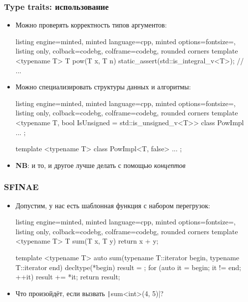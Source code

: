 \documentclass[10pt]{beamer}
\begin{document}
\begin{frame}[fragile]
\frametitle{Type traits: использование}
\begin{itemize}
\item Можно проверять корректность типов аргументов:
\begin{tcblisting}{listing engine=minted, minted language=cpp, minted options={fontsize=\scriptsize}, listing only, colback=codebg, colframe=codebg, rounded corners}
template <typename T>
T pow(T x, T n) {
  static_assert(std::is_integral_v<T>);
  // ...
}
\end{tcblisting}
\pause
\item Можно специализировать структуры данных и алгоритмы:
\begin{tcblisting}{listing engine=minted, minted language=cpp, minted options={fontsize=\scriptsize}, listing only, colback=codebg, colframe=codebg, rounded corners}
template <typename T, bool IsUnsigned = std::is_unsigned_v<T>>
class PowImpl { ... };

template <typename T>
class PowImpl<T, false> { ... };
\end{tcblisting}
\pause
\item \textbf{NB}: и то, и другое лучше делать с помощью \textit{концептов}
\end{itemize}
\end{frame}

\begin{frame}[fragile]
\frametitle{SFINAE}
\begin{itemize}
\item Допустим, у нас есть шаблонная функция с набором перегрузок:
\begin{tcblisting}{listing engine=minted, minted language=cpp, minted options={fontsize=\scriptsize}, listing only, colback=codebg, colframe=codebg, rounded corners}
template <typename T>
T sum(T x, T y) {
  return x + y;
}

template <typename T>
auto sum(typename T::iterator begin, typename T::iterator end) {
  decltype(*begin) result = {};
  for (auto it = begin; it != end; ++it)
    result += *it;
  return result;
}
\end{tcblisting}
\pause
{}
\item Что произойдёт, если вызвать \texttt|sum<int>(4, 5)|?
\end{itemize}
\end{frame}
\end{document}
